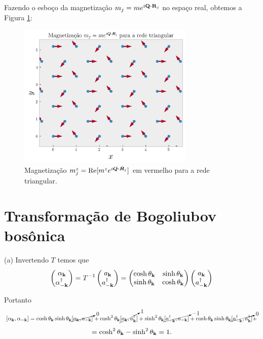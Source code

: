 \documentclass[a4paper,10pt]{article}
\begin{document}
Fazendo o esboço da magnetização $m_j = m e^{i \vb{Q} \vdot \vb{R}_j}$ no espaço real, obtemos a Figura \ref{fig:mag-triang}:
\begin{figure}[H]
\centering
\includegraphics[width=0.75\textwidth]{fig/mag_triang-real_space.png}
\caption{Magnetização $m^z_j = \Re[m^z e^{i \bm{Q} \vdot \bm{R}_j}]$ em vermelho para a rede triangular.}
\label{fig:mag-triang}
\end{figure}

\pagebreak

\section{Transformação de Bogoliubov bosônica}

(a) Invertendo $T$ temos que
$$
\begin{pmatrix}
\alpha_{\vb{k}} \\ \alpha_{-\vb{k}}^\dagger
\end{pmatrix}
=
T^{-1}
\begin{pmatrix}
a_{\vb{k}} \\ a_{-\vb{k}}^\dagger
\end{pmatrix}
=
\begin{pmatrix}
\cosh\theta_{\vb{k}} & \sinh\theta_{\vb{k}} \\
\sinh\theta_{\vb{k}} & \cosh\theta_{\vb{k}}
\end{pmatrix}
\begin{pmatrix}
a_{\vb{k}} \\ a_{-\vb{k}}^\dagger
\end{pmatrix}
$$

Portanto
$$
[\alpha_{\vb{k}}, \alpha_{-\vb{k}}] =
\cosh\theta_{\vb{k}}\sinh\theta_{\vb{k}} \cancelto{0}{[a_{\vb{k}}, a_{-\vb{k}}]} +
\cosh^2\theta_{\vb{k}} \cancelto{1}{[a_{\vb{k}}, a_{\vb{k}}^\dagger]} +
\sinh^2\theta_{\vb{k}} \cancelto{-1}{[a_{-\vb{k}}^\dagger, a_{-\vb{k}}]} +
\cosh\theta_{\vb{k}}\sinh\theta_{\vb{k}} \cancelto{0}{[a_{-\vb{k}}^\dagger, a_{\vb{k}}^\dagger]} +
$$
$$
= \cosh^2\theta_{\vb{k}} - \sinh^2\theta_{\vb{k}} = 1.
$$
\end{document}
